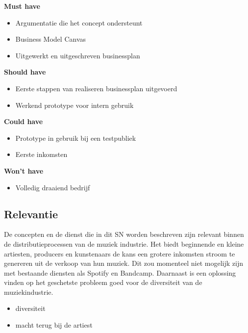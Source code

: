 \parbox{\textwidth}{
    \textbf{Must have}
    \begin{itemize}
        \item Argumentatie die het concept ondersteunt
        \item Business Model Canvas
        \item Uitgewerkt en uitgeschreven businessplan
    \end{itemize}
    \textbf{Should have}
    \begin{itemize}
        \item Eerste stappen van realiseren businessplan uitgevoerd
        \item Werkend prototype voor intern gebruik
    \end{itemize}
    \textbf{Could have}
    \begin{itemize}
        \item Prototype in gebruik bij een testpubliek
        \item Eerste inkomsten
    \end{itemize}
    \textbf{Won't have}
    \begin{itemize}
        \item Volledig draaiend bedrijf
    \end{itemize}
}

\subsection{Relevantie}
De concepten en de dienst die in dit SN worden beschreven zijn relevant binnen de distributieprocessen van de muziek industrie. Het biedt beginnende en kleine artiesten, producers en kunstenaars de kans een grotere inkomsten stroom te genereren uit de verkoop van hun muziek. Dit zou momenteel niet mogelijk zijn met bestaande diensten als Spotify en Bandcamp. Daarnaast is een oplossing vinden op het geschetste probleem goed voor de diversiteit van de muziekindustrie.

\begin{itemize}
    \item diversiteit
    \item macht terug bij de artiest
\end{itemize}

